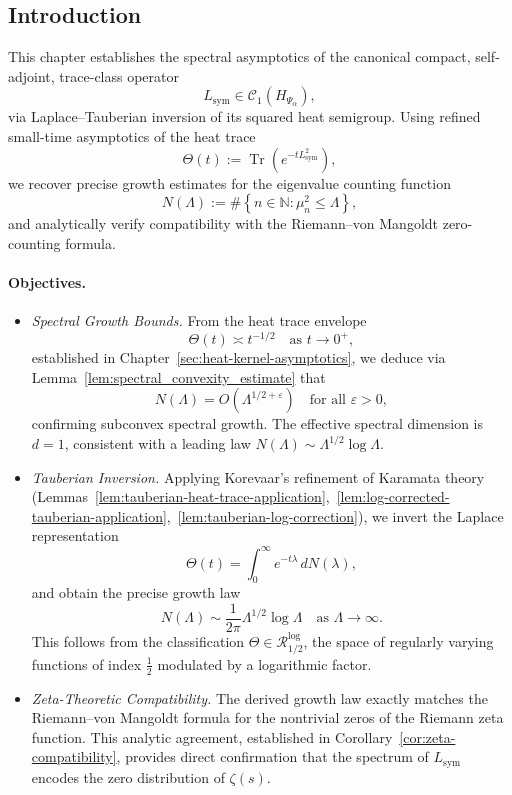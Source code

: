 \subsection*{Introduction}

This chapter establishes the spectral asymptotics of the canonical compact, self-adjoint, trace-class operator
\[
L_{\mathrm{sym}} \in \mathcal{C}_1(H_{\Psi_\alpha}),
\]
via Laplace–Tauberian inversion of its squared heat semigroup. Using refined small-time asymptotics of the heat trace
\[
\Theta(t) := \operatorname{Tr}(e^{-t L_{\mathrm{sym}}^2}),
\]
we recover precise growth estimates for the eigenvalue counting function
\[
N(\Lambda) := \#\left\{ n \in \mathbb{N} : \mu_n^2 \le \Lambda \right\},
\]
and analytically verify compatibility with the Riemann–von Mangoldt zero-counting formula.

\paragraph{Objectives.}
\begin{itemize}
  \item \textit{Spectral Growth Bounds.}  
  From the heat trace envelope
  \[
  \Theta(t) \asymp t^{-1/2} \quad \text{as } t \to 0^+,
  \]
  established in Chapter~\ref{sec:heat-kernel-asymptotics}, we deduce via Lemma~\ref{lem:spectral_convexity_estimate} that
  \[
  N(\Lambda) = O(\Lambda^{1/2+\varepsilon}) \quad \text{for all } \varepsilon > 0,
  \]
  confirming subconvex spectral growth. The effective spectral dimension is \( d = 1 \), consistent with a leading law \( N(\Lambda) \sim \Lambda^{1/2} \log \Lambda \).

  \item \textit{Tauberian Inversion.}  
  Applying Korevaar’s refinement of Karamata theory (Lemmas~\ref{lem:tauberian-heat-trace-application},~\ref{lem:log-corrected-tauberian-application},~\ref{lem:tauberian-log-correction}), we invert the Laplace representation
  \[
  \Theta(t) = \int_0^\infty e^{-t\lambda} \, dN(\lambda),
  \]
  and obtain the precise growth law
  \[
  N(\Lambda) \sim \frac{1}{2\pi} \Lambda^{1/2} \log \Lambda \quad \text{as } \Lambda \to \infty.
  \]
  This follows from the classification \( \Theta \in \mathcal{R}_{1/2}^{\log} \), the space of regularly varying functions of index \( \frac{1}{2} \) modulated by a logarithmic factor.

  \item \textit{Zeta-Theoretic Compatibility.}  
  The derived growth law exactly matches the Riemann–von Mangoldt formula for the nontrivial zeros of the Riemann zeta function. This analytic agreement, established in Corollary~\ref{cor:zeta-compatibility}, provides direct confirmation that the spectrum of \( L_{\mathrm{sym}} \) encodes the zero distribution of \( \zeta(s) \).
\end{itemize}

